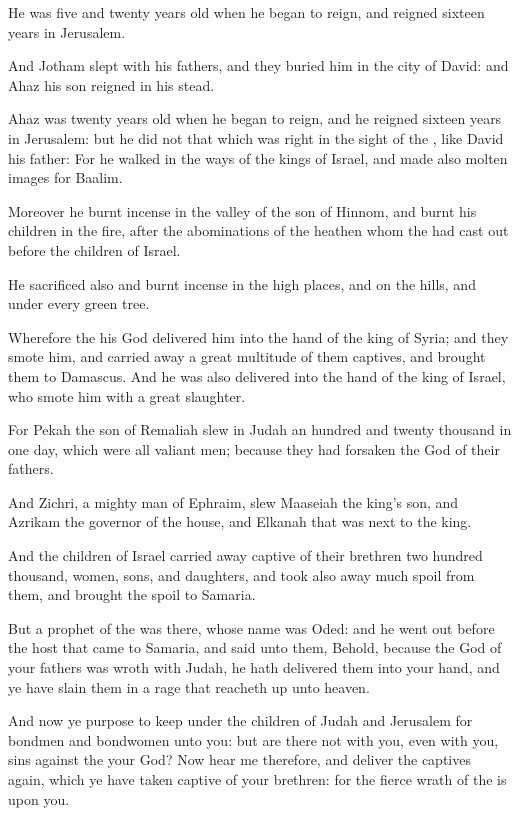 \Verse He was five and twenty years old when he began to reign, and reigned sixteen years in Jerusalem.

\Verse And Jotham slept with his fathers, and they buried him in the city of David: and Ahaz his son reigned in his stead.


\Chapter
\Verse Ahaz was twenty years old when he began to reign, and he reigned sixteen years in Jerusalem: but he did not that which was right in the sight of the \LORD, like David his father: \Verse For he walked in the ways of the kings of Israel, and made also molten images for Baalim.

\Verse Moreover he burnt incense in the valley of the son of Hinnom, and burnt his children in the fire, after the abominations of the heathen whom the \LORD had cast out before the children of Israel.

\Verse He sacrificed also and burnt incense in the high places, and on the hills, and under every green tree.

\Verse Wherefore the \LORD his God delivered him into the hand of the king of Syria; and they smote him, and carried away a great multitude of them captives, and brought them to Damascus. And he was also delivered into the hand of the king of Israel, who smote him with a great slaughter.

\Verse For Pekah the son of Remaliah slew in Judah an hundred and twenty thousand in one day, which were all valiant men; because they had forsaken the \LORD God of their fathers.

\Verse And Zichri, a mighty man of Ephraim, slew Maaseiah the king's son, and Azrikam the governor of the house, and Elkanah that was next to the king.

\Verse And the children of Israel carried away captive of their brethren two hundred thousand, women, sons, and daughters, and took also away much spoil from them, and brought the spoil to Samaria.

\Verse But a prophet of the \LORD was there, whose name was Oded: and he went out before the host that came to Samaria, and said unto them, Behold, because the \LORD God of your fathers was wroth with Judah, he hath delivered them into your hand, and ye have slain them in a rage that reacheth up unto heaven.

\Verse And now ye purpose to keep under the children of Judah and Jerusalem for bondmen and bondwomen unto you: but are there not with you, even with you, sins against the \LORD your God?  \Verse Now hear me therefore, and deliver the captives again, which ye have taken captive of your brethren: for the fierce wrath of the \LORD is upon you.

